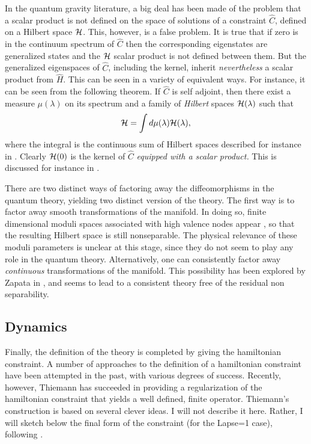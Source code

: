 In the quantum gravity literature, a big deal has been made of 
the problem that a scalar product is not defined on the space of 
solutions of a constraint $\hat C$, defined on a Hilbert space $\cal 
H$.  This, however, is a false problem.  It is true that if zero 
is in the continuum spectrum of $\hat C$ then the corresponding 
eigenstates are generalized states and the $\cal H$ scalar 
product is not defined between them.  But the generalized 
eigenspaces of $\hat C$, including the kernel, inherit {\em 
nevertheless\/} a scalar product from $\hat H$.  This can be seen 
in a variety of equivalent ways.  For instance, it can be seen  
from the following theorem.  If $\hat C$ is self adjoint, then 
there exist a measure $\mu(\lambda)$ on its spectrum and a family 
of {\em Hilbert\/} spaces ${\cal H}(\lambda)$ such that
\begin{equation}
	{\cal H} = \int d\mu(\lambda) {\cal H}(\lambda),
\end{equation}
where the integral is the continuous sum of Hilbert spaces 
described for instance in \cite{Guichardet}. Clearly ${\cal 
H}(0)$ is the kernel of $\hat C$ {\em equipped with a scalar 
product.} This is discussed for instance in \cite{RovelliTh}. 

There are two distinct ways of factoring away the diffeomorphisms 
in the quantum theory, yielding two distinct version of the 
theory.  The first way is to factor away smooth transformations of 
the manifold.  In doing so, finite dimensional moduli spaces 
associated with high valence nodes appear 
\cite{GrottRovelli96}, so that the resulting Hilbert space is still 
nonseparable.  The physical relevance of these moduli parameters 
is unclear at this stage, since they do not seem to play any role 
in the quantum theory.  Alternatively, one can consistently 
factor away {\em continuous\/} transformations of the manifold. 
This possibility has been explored by Zapata in \cite{Zapata,Zapata2}, 
and seems to lead to a consistent theory free of the residual non 
separability. 

\subsection{Dynamics}

Finally, the definition of the theory is completed by giving the 
hamiltonian constraint.  A number of approaches to the definition 
of a hamiltonian constraint have been attempted in the past, with 
various degrees of success.  Recently, however, Thiemann has 
succeeded in providing a regularization of the hamiltonian 
constraint that yields a well defined, finite operator.  
Thiemann's construction \cite{Thiemann96,Thiemann96b,Thiemann96c} 
is based on several clever ideas.  I will not describe it here.  
Rather, I will sketch below the final form of the constraint (for 
the Lapse=1 case), following \cite{Rovelli95b}.

